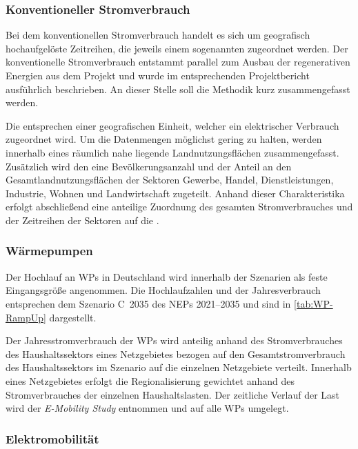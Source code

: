 \subsubsection{Konventioneller Stromverbrauch}

Bei dem konventionellen Stromverbrauch handelt es sich um geo­gra­fisch hochaufgelöste Zeitreihen, die jeweils einem sogenannten \Lastgebiet zugeordnet werden.
Der konventionelle Stromverbrauch entstammt parallel zum Ausbau der regenerativen Energien aus dem  Projekt und wurde im entsprechenden Projektbericht \cite{Mueller2019} ausführlich beschrieben.
An dieser Stelle soll die Methodik kurz zusammengefasst werden.\medskip

Die \Lastgebiete entsprechen einer geo­gra­fischen Einheit, welcher ein elektrischer Verbrauch zugeordnet wird.
Um die Datenmengen möglichst gering zu halten, werden innerhalb eines \Lastgebietes räumlich nahe liegende Landnutzungsflächen zusammengefasst.
Zusätzlich wird den \Lastgebieten eine Bevölkerungsanzahl und der Anteil an den Gesamtlandnutzungsflächen der Sektoren Gewerbe, Handel, Dienstleistungen, Industrie, Wohnen und Landwirtschaft zugeteilt.
Anhand dieser Charakteristika erfolgt abschließend eine anteilige Zuordnung des gesamten Stromverbrauches und der Zeitreihen der Sektoren auf die \Lastgebietedot.


\subsubsection{Wärmepumpen}

Der Hochlauf an \glspl{WP} in Deutschland wird innerhalb der Szenarien als feste Eingangsgröße angenommen.
Die Hochlaufzahlen und der Jahresverbrauch entsprechen dem Szenario C~\num{2035} des \glspl{NEP} \numrange[range-phrase=~{--}~]{2021}{2035} \cite{BNetzA2020} und sind in \autoref{tab:WP-RampUp} dargestellt.\medskip

Der Jahresstromverbrauch der \glspl{WP} wird anteilig anhand des Stromverbrauches des Haushaltssektors eines Netzgebietes bezogen auf den Gesamtstromverbrauch des Haushaltssektors im Szenario \ego auf die einzelnen Netzgebiete verteilt.
Innerhalb eines Netzgebietes erfolgt die Regionalisierung gewichtet anhand des Stromverbrauches der einzelnen Haushaltslasten.
Der zeitliche Verlauf der Last wird der \textit{E-Mobility Study} \cite{Schachler} entnommen und auf alle \glspl{WP} umgelegt.




\subsubsection{Elektromobilität}\label{chap:EMob_Szenarien}

